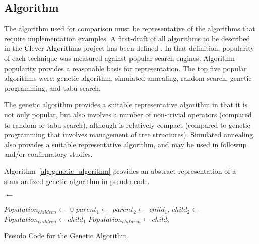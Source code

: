 \documentclass[a4paper, 11pt]{article}
\begin{document}
% 
% 
\subsection{Algorithm}
The algorithm used for comparison must be representative of the algorithms that require implementation examples. A first-draft of all algorithms to be described in the Clever Algorithms project has been defined \cite{Brownlee2010a}. In that definition, popularity of each technique was measured against popular search engines. Algorithm popularity provides a reasonable basis for representation. The top five popular algorithms were: genetic algorithm, simulated annealing, random search, genetic programming, and tabu search.

The genetic algorithm provides a suitable representative algorithm in that it is not only popular, but also involves a number of non-trivial operators (compared to random or tabu search), although is relatively compact (compared to genetic programming that involves management of tree structures). Simulated annealing also provides a suitable representative algorithm, and may be used in followup and/or confirmatory studies. 

Algorithm~\ref{alg:genetic_algorithm} provides an abstract representation of a standardized genetic algorithm in pseudo code.

\begin{algorithm}[ht]
  \SetLine  
  
  
  \KwOut{\Pop}
  	
	\Pop $\leftarrow$ \InitializeRandomBitstrings{\PopSize, \Length}\;
	
	\While{$\neg$\StopCondition{}}
	{
	 {
	 	\;
	 }
	 $Population_{children} \leftarrow$ 0\;
	{
		$parent_1 \leftarrow$ \TournamentSelection{\Pop, \BoutSize}\;
		$parent_2 \leftarrow$ \TournamentSelection{\Pop, \BoutSize}\;
		$child_1$, $child_2 \leftarrow$ \;
		$Population_{children} \leftarrow child_1$\;
		$Population_{children} \leftarrow child_2$\;
	}
	 {
    	\;
	 }	 
	 \;
	}
	\Return{\Pop}\;
	
	\caption{Pseudo Code for the Genetic Algorithm.}
	\label{alg:genetic_algorithm}
\end{algorithm}
\end{document}

